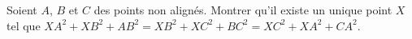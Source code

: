 Soient $A$, $B$ et $C$ des points non alignés. Montrer qu'il existe un unique point $X$ tel que $XA^2 + XB^2 + AB^2 = XB^2 + XC^2 + BC^2 = XC^2 + XA^2 + CA^2$.
